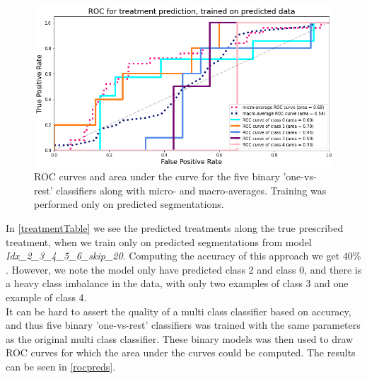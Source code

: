 \begin{figure}[H]
	\centering
	\includegraphics[width=0.85\linewidth]{Materials/Results/Treatment/RocPreds}
	\caption{ROC curves and area under the curve for the five binary 'one-vs-rest' classifiers along with micro- and macro-averages. Training was performed only on predicted segmentations.}
	\label{rocpreds}
\end{figure}
In \autoref{treatmentTable} we see the predicted treatments along the true prescribed treatment, when we train only on predicted segmentations from model \textit{Idx\_2\_3\_4\_5\_6\_skip\_20}. Computing the accuracy of this approach we get $40\%$. However, we note the model only have predicted class 2 and class 0, and there is a heavy class imbalance in the data, with only two examples of class 3 and one example of class 4.\\
It can be hard to assert the quality of a multi class classifier based on accuracy, and thus five binary 'one-vs-rest' classifiers was trained with the same parameters as the original multi class classifier. These binary models was then used to draw ROC curves for which the area under the curves could be computed. The results can be seen in \autoref{rocpreds}.

